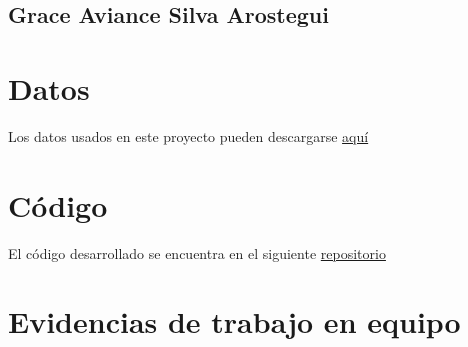 \documentclass[journal]{IEEEtran}                                                          %
\begin{document}
        \subsection{Grace Aviance Silva Arostegui}


    \appendices
    
    \section{Datos} \label{data}

        Los datos usados en este proyecto pueden descargarse \href{https://www.kaggle.com/code/ravaliraj/risk-classification-of-cervical-cancer}{aquí}

    \section{Código}

        El código desarrollado se encuentra en el siguiente \href{https://github.com/JuanEcheagaray75/cancer-clf}{repositorio}
    \section{Evidencias de trabajo en equipo}

    
    
\end{document}
